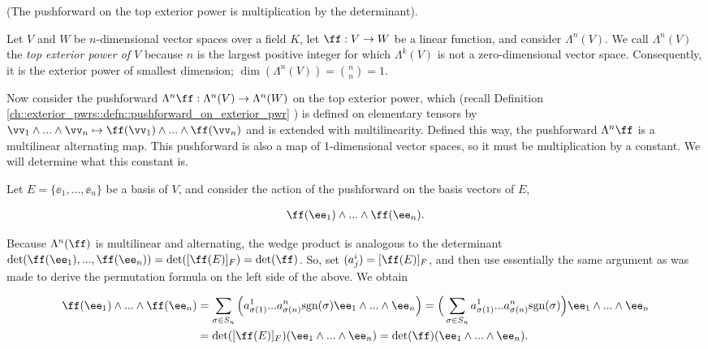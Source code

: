 \begin{theorem}
\label{ch::exterior_pwrs::rmk::top_pushforward_det}
    (The pushforward on the top exterior power is multiplication by the determinant).
    
    Let $V$ and $W$ be $n$-dimensional vector spaces over a field $K$, let $\ff:V \rightarrow W$ be a linear function, and consider $\Lambda^n(V)$. We call $\Lambda^n(V)$ the \textit{top exterior power of $V$} because $n$ is the largest positive integer for which $\Lambda^k(V)$ is not a zero-dimensional vector space. Consequently, it is the exterior power of smallest dimension; $\dim(\Lambda^n(V)) = \binom{n}{n} = 1$.
    
    Now consider the pushforward $\Lambda^n \ff: \Lambda^n(V) \rightarrow \Lambda^n(W)$ on the top exterior power, which (recall Definition \ref{ch::exterior_pwrs::defn::pushforward_on_exterior_pwr}
) is defined on elementary tensors by $\vv_1 \wedge ... \wedge \vv_n \mapsto \ff(\vv_1) \wedge ... \wedge \ff(\vv_n)$ and is extended with multilinearity. Defined this way, the pushforward $\Lambda^n \ff$ is a multilinear alternating map. This pushforward is also a map of 1-dimensional vector spaces, so it must be multiplication by a constant. We will determine what this constant is.
    
    Let $E = \{\ee_1, ..., \ee_n\}$ be a basis of $V$, and consider the action of the pushforward on the basis vectors of $E$,
    
    \begin{align*}
        \ff(\ee_1) \wedge ... \wedge \ff(\ee_n).
    \end{align*}
    
    Because $\Lambda^n(\ff)$ is multilinear and alternating, the wedge product is analogous to the determinant $\det(\ff(\ee_1), ..., \ff(\ee_n)) = \det([\ff(E)]_F) = \det(\ff)$. So, set $(a^i_j) = [\ff(E)]_F$, and then use essentially the same argument as was made to derive the permutation formula on the left side of the above. We obtain
    
    \begin{align*}
        \ff(\ee_1) \wedge ... \wedge 
        \ff(\ee_n) 
        &= \sum_{\sigma \in S_n} \Big( a^1_{\sigma(1)} ... a^n_{\sigma(n)} \sgn(\sigma) \ee_1 \wedge ... \wedge \ee_n \Big)
        = \Big( \sum_{\sigma \in S_n} a^1_{\sigma(1)} ... a^n_{\sigma(n)} \sgn(\sigma) \Big) \ee_1 \wedge ... \wedge \ee_n \\
        &= \det([\ff(E)]_F) (\ee_1 \wedge ... \wedge \ee_n)
        = \det(\ff) (\ee_1 \wedge ... \wedge \ee_n).
    \end{align*}
    

\end{theorem}
